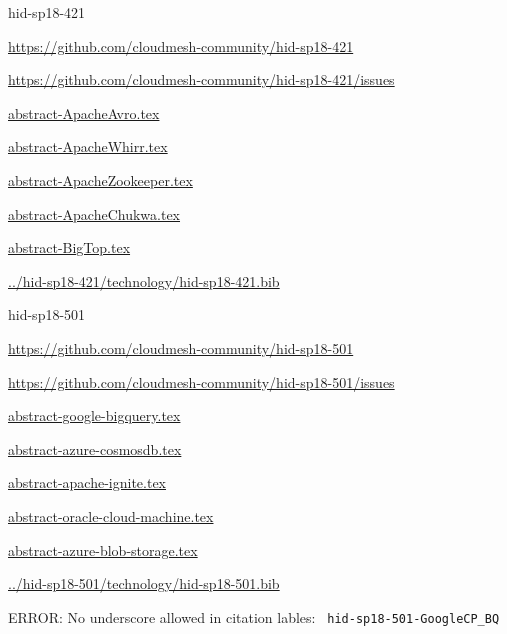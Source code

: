 \begin{IU}

hid-sp18-421

\url{https://github.com/cloudmesh-community/hid-sp18-421}

\url{https://github.com/cloudmesh-community/hid-sp18-421/issues}

\href{https://github.com/cloudmesh-community/hid-sp18-421/blob/master//technology/abstract-ApacheAvro.tex}{abstract-ApacheAvro.tex}

\href{https://github.com/cloudmesh-community/hid-sp18-421/blob/master//technology/abstract-ApacheWhirr.tex}{abstract-ApacheWhirr.tex}

\href{https://github.com/cloudmesh-community/hid-sp18-421/blob/master//technology/abstract-ApacheZookeeper.tex}{abstract-ApacheZookeeper.tex}

\href{https://github.com/cloudmesh-community/hid-sp18-421/blob/master//technology/abstract-ApacheChukwa.tex}{abstract-ApacheChukwa.tex}

\href{https://github.com/cloudmesh-community/hid-sp18-421/blob/master//technology/abstract-BigTop.tex}{abstract-BigTop.tex}

\href{https://github.com/cloudmesh-community/hid-sp18-421/blob/master//technology/hid-sp18-421.bib}{../hid-sp18-421/technology/hid-sp18-421.bib}

\end{IU}


\begin{IU}

hid-sp18-501

\url{https://github.com/cloudmesh-community/hid-sp18-501}

\url{https://github.com/cloudmesh-community/hid-sp18-501/issues}

\href{https://github.com/cloudmesh-community/hid-sp18-501/blob/master//technology/abstract-google-bigquery.tex}{abstract-google-bigquery.tex}

\href{https://github.com/cloudmesh-community/hid-sp18-501/blob/master//technology/abstract-azure-cosmosdb.tex}{abstract-azure-cosmosdb.tex}

\href{https://github.com/cloudmesh-community/hid-sp18-501/blob/master//technology/abstract-apache-ignite.tex}{abstract-apache-ignite.tex}

\href{https://github.com/cloudmesh-community/hid-sp18-501/blob/master//technology/abstract-oracle-cloud-machine.tex}{abstract-oracle-cloud-machine.tex}

\href{https://github.com/cloudmesh-community/hid-sp18-501/blob/master//technology/abstract-azure-blob-storage.tex}{abstract-azure-blob-storage.tex}

\href{https://github.com/cloudmesh-community/hid-sp18-501/blob/master//technology/hid-sp18-501.bib}{../hid-sp18-501/technology/hid-sp18-501.bib}

 ERROR: No underscore allowed in citation lables: \verb| hid-sp18-501-GoogleCP_BQ |

\end{IU}


